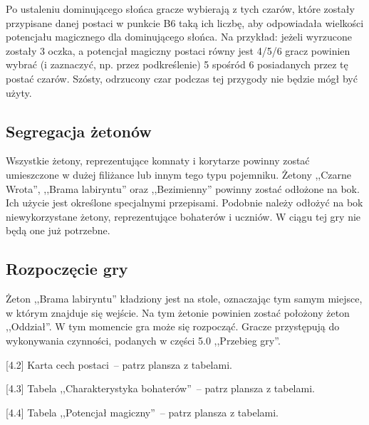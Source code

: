 Po ustaleniu dominującego słońca gracze wybierają z tych czarów, które zostały przypisane danej postaci w punkcie B6 taką ich liczbę, aby odpowiadała wielkości potencjału magicznego dla dominującego słońca.
Na przykład: jeżeli wyrzucone zostały 3 oczka, a potencjał magiczny postaci równy jest 4/5/6 gracz powinien wybrać (i zaznaczyć, np. przez podkreślenie) 5 spośród 6 posiadanych przez tę postać czarów.
Szósty, odrzucony czar podczas tej przygody nie będzie mógł być użyty.

\subsection{Segregacja żetonów}

Wszystkie żetony, reprezentujące komnaty i korytarze powinny zostać umieszczone w dużej filiżance lub innym tego typu pojemniku.
Żetony ,,Czarne Wrota'', ,,Brama labiryntu'' oraz ,,Bezimienny'' powinny zostać odłożone na bok.
Ich użycie jest określone specjalnymi przepisami.
Podobnie należy odłożyć na bok niewykorzystane żetony, reprezentujące bohaterów i uczniów.
W ciągu tej gry nie będą one już potrzebne.

\subsection{Rozpoczęcie gry}

Żeton ,,Brama labiryntu'' kładziony jest na stole, oznaczając tym samym miejsce, w którym znajduje się wejście.
Na tym żetonie powinien zostać położony żeton ,,Oddział''.
W tym momencie gra może się rozpocząć.
Gracze przystępują do wykonywania czynności, podanych w części 5.0 ,,Przebieg gry''.

[4.2] Karta cech postaci~-- patrz plansza z tabelami.

[4.3] Tabela ,,Charakterystyka bohaterów''~-- patrz plansza z tabelami.

[4.4] Tabela ,,Potencjał magiczny''~-- patrz plansza z tabelami.
